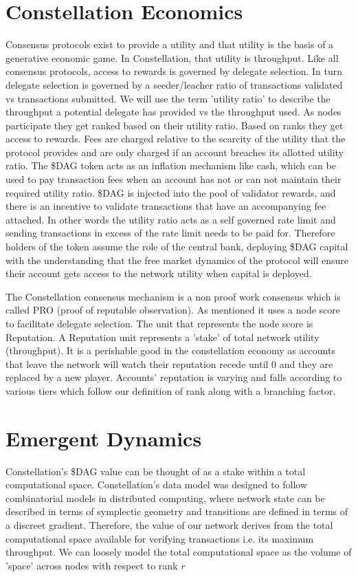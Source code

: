\documentclass{article}
\begin{document}
\section{Constellation Economics}
Consensus protocols exist to provide a utility and that utility is the basis of a generative economic game. In Constellation, that utility is throughput. Like all consensus protocols, access to rewards is governed by delegate selection. In turn delegate selection is governed by a seeder/leacher ratio of transactions validated vs transactions submitted. We will use the term 'utility ratio' to describe the throughput a potential delegate has provided vs the throughput used. As nodes participate they get ranked based on their utility ratio. Based on ranks they get access to rewards. Fees are charged relative to the scarcity of the utility that the protocol provides and are only charged if an account breaches its allotted utility ratio. The \$DAG token acts as an inflation mechanism like cash, which can be used to pay transaction fees when an account has not or can not maintain their required utility ratio. \$DAG is injected into the pool of validator rewards, and there is an incentive to validate transactions that have an accompanying fee attached. In other words the utility ratio acts as a self governed rate limit and sending transactions in excess of the rate limit needs to be paid for. Therefore holders of the token assume the role of the central bank, deploying \$DAG capital with the understanding that the free market dynamics of the protocol will ensure their account gets access to the network utility when capital is deployed. 

The Constellation consensus mechanism is a non proof work consensus which is called PRO (proof of reputable observation). As mentioned it uses a node score to facilitate delegate selection. The unit that represents the node score is Reputation. A  Reputation unit represents a 'stake' of total network utility (throughput). It is a perishable good in the constellation economy as accounts that leave the network will watch their reputation recede until 0 and they are replaced by a new player. Accounts' reputation is varying and falls according to various tiers which follow our definition of rank along with a branching factor.

\section{Emergent Dynamics}
Constellation's \$DAG value can be thought of as a stake within a total computational space. Constellation's data model was designed to follow combinatorial models in distributed computing, where network state can be described in terms of symplectic geometry and transitions are defined in terms of a discreet gradient. Therefore, the value of our network derives from the total computational space available for verifying transactions i.e. its maximum throughput. We can loosely model the total computational space as the volume of 'space' across nodes with respect to rank $r$
\end{document}
